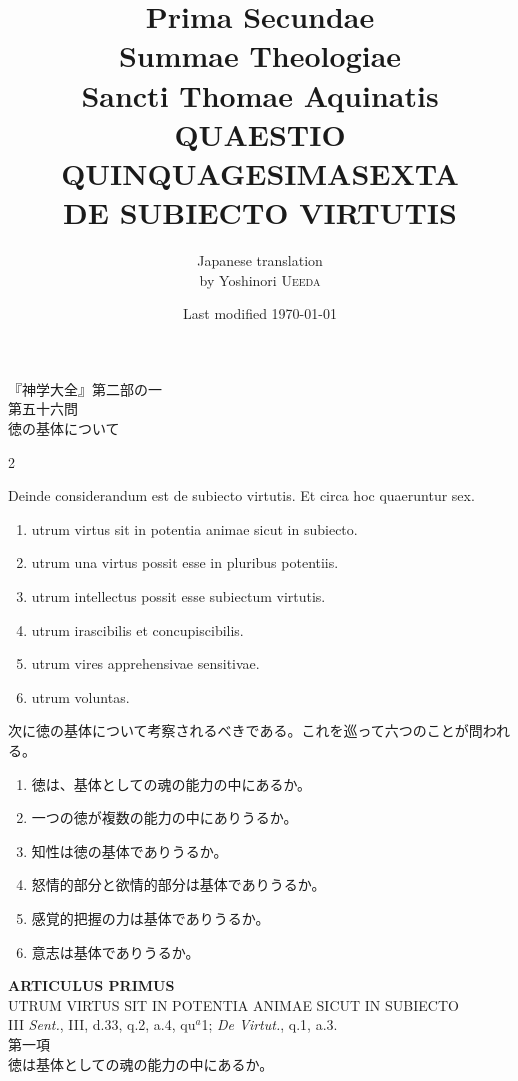 \documentclass[paper=a4paper,fontsize=10pt,jafontsize=9pt,titlepage]{jlreq}
\title{{\bfseries Prima Secundae}\\{\Huge Summae Theologiae}\\Sancti Thomae
Aquinatis\\{\sffamily QUAESTIO QUINQUAGESIMASEXTA}\\{\bfseries DE SUBIECTO VIRTUTIS}}
\author{Japanese translation\\by Yoshinori {\scshape Ueeda}}
\date{Last modified \today}
\begin{document}
\maketitle
\thispagestyle{empty}
\begin{center}
{\Large 『神学大全』第二部の一\\第五十六問\\徳の基体について}
\end{center}

\begin{paracol}{2}

Deinde considerandum est de subiecto virtutis. Et circa hoc quaeruntur sex. 

\begin{enumerate}
 \item utrum virtus sit in potentia animae sicut in subiecto.
 \item utrum una virtus possit esse in pluribus potentiis.
 \item utrum intellectus possit esse subiectum virtutis.
 \item utrum irascibilis et concupiscibilis.
 \item utrum vires apprehensivae sensitivae.
 \item utrum voluntas.
\end{enumerate}

\switchcolumn

次に徳の基体について考察されるべきである。これを巡って六つのことが問われる。

\begin{enumerate}
 \item 徳は、基体としての魂の能力の中にあるか。
 \item 一つの徳が複数の能力の中にありうるか。
 \item 知性は徳の基体でありうるか。
 \item 怒情的部分と欲情的部分は基体でありうるか。
 \item 感覚的把握の力は基体でありうるか。
 \item 意志は基体でありうるか。
\end{enumerate}

\end{paracol}

\newpage
{}
{}
\setcounter{section}{1}
\setcounter{subsection}{0}

\begin{center}
{\Large {\bfseries ARTICULUS PRIMUS}}\\
{\large UTRUM VIRTUS SIT IN POTENTIA ANIMAE SICUT IN SUBIECTO}\\
{\footnotesize III {\itshape Sent.}, III, d.33, q.2, a.4, qu$^{a}$1; {\itshape De Virtut.}, q.1, a.3.}\\
{\Large 第一項\\徳は基体としての魂の能力の中にあるか。}
\end{center}
\end{document}
